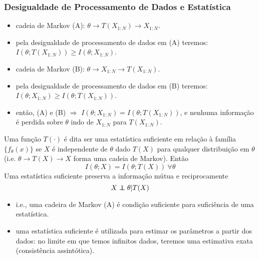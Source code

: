 \begin{frame}[allowframebreaks]
  \frametitle{Desigualdade de Processamento de Dados e Estatística}
  \begin{itemize}
  \item cadeia de Markov (A): $\theta \rightarrow T(X_{1:N}) \rightarrow X_{1:N}$.
  \item pela desigualdade de processamento de dados em (A) teremos: $I(\theta;T(X_{1:N})) \geq I(\theta;X_{1:N})$.
  \item cadeia de Markov (B): $\theta \rightarrow X_{1:N} \rightarrow T(X_{1:N})$.
  \item pela desigualdade de processamento de dados em (B) teremos: $I(\theta;X_{1:N}) \geq I(\theta;T(X_{1:N}))$.
  \item então, (A) e (B) $\Rightarrow$ $I(\theta;X_{1:N}) = I(\theta;T(X_{1:N}))$, e nenhuma 
        informação é perdida sobre $\theta$ indo de $X_{1:N}$ para $T(X_{1:N})$.
  \end{itemize}
  
  \begin{definition}
  Uma função $T(\cdot)$ é dita ser uma estatística suficiente em relação à família
  $\{f_{\theta} (x)\}$ se $X$ é independente de $\theta$ dado $T(X)$ para qualquer
  distribuição em $\theta$ (i.e. $\theta \rightarrow T(X) \rightarrow X$ forma uma
  cadeia de Markov). Então 
  \begin{equation}
  I(\theta ; X) = I(\theta ; T(X)) \ \forall \theta
  \end{equation}
  Uma estatística suficiente preserva a informação mútua e reciprocamente
  \begin{equation}
  X \independent \theta | T(X)
  \end{equation}
  \end{definition}
  \begin{itemize}
  \item i.e., uma cadeira de Markov (A) é condição suficiente para suficiência de uma estatística.
  \item uma estatística suficiente é utilizada para estimar os parâmetros a partir dos dados:
  no limite em que temos infinitos dados, teremos uma estimativa exata (consistência assintótica).
  \end{itemize}
\end{frame}


